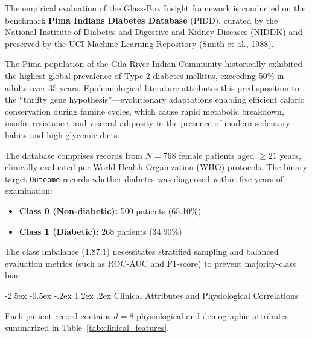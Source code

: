 \documentclass[12pt,a4paper,oneside]{report}
\makeatletter
\renewcommand\section{\@startsection {section}{1}{\z@}%
                                   {-2.5ex \@plus -0.5ex \@minus -.2ex}%
                                   {1.2ex \@plus .2ex}%
                                   {\normalfont\fontsize{13}{16}\selectfont\bfseries}}
\makeatother
\begin{document}
The empirical evaluation of the Glass-Box Insight framework is conducted on the benchmark \textbf{Pima Indians Diabetes Database} (PIDD), curated by the National Institute of Diabetes and Digestive and Kidney Diseases (NIDDK) and preserved by the UCI Machine Learning Repository (Smith et al., 1988).

The Pima population of the Gila River Indian Community historically exhibited the highest global prevalence of Type 2 diabetes mellitus, exceeding 50\% in adults over 35 years. Epidemiological literature attributes this predisposition to the ``thrifty gene hypothesis''—evolutionary adaptations enabling efficient caloric conservation during famine cycles, which cause rapid metabolic breakdown, insulin resistance, and visceral adiposity in the presence of modern sedentary habits and high-glycemic diets.

The database comprises records from $N = 768$ female patients aged $\ge 21$ years, clinically evaluated per World Health Organization (WHO) protocols. The binary target \texttt{Outcome} records whether diabetes was diagnosed within five years of examination:
\begin{itemize}
    \setlength{\itemsep}{0pt}
    \setlength{\parskip}{0pt}
    \item \textbf{Class 0 (Non-diabetic):} 500 patients (65.10\%)
    \item \textbf{Class 1 (Diabetic):} 268 patients (34.90\%)
\end{itemize}
The class imbalance (1.87:1) necessitates stratified sampling and balanced evaluation metrics (such as ROC-AUC and F1-score) to prevent majority-class bias.

\section{Clinical Attributes and Physiological Correlations}

Each patient record contains $d = 8$ physiological and demographic attributes, summarized in Table~\ref{tab:clinical_features}.
\end{document}
